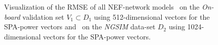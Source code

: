 \begin{figure}[t!]
	\centering
    \caption{Visualization of the \ac{RMSE} of all \ac{NEF}-network models~\protect{} on the \emph{On-board} validation set $V_1 \subset D_1$ using \num{512}-dimensional vectors for the \ac{SPA}-power vectors and~\protect{} on the \emph{\ac{NGSIM}} data-set $D_2$ using \num{1024}-dimensional vectors for the \ac{SPA}-power vectors.}\label{fig:rmse_nef_nets}

\end{figure}

